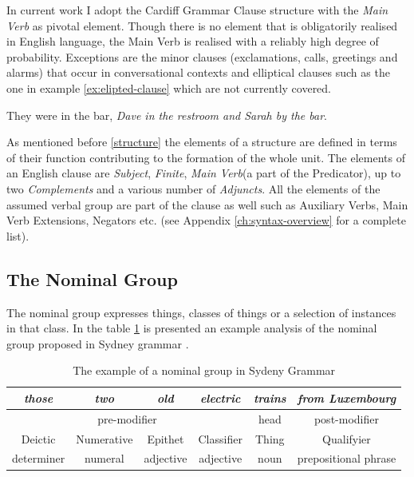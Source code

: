 In current work I adopt the Cardiff Grammar Clause structure with the \textit{Main Verb} as pivotal element. Though there is no element that is obligatorily realised in English language, the Main Verb is realised with a reliably high degree of probability. Exceptions are the minor clauses (exclamations, calls, greetings and alarms) that occur in conversational contexts and elliptical clauses \citet{Halliday2013} such as the one in example \ref{ex:elipted-clause} which are not currently covered.

\begin{exe}
	\ex\label{ex:elipted-clause} They were in the bar, \textit{Dave in the restroom and Sarah by the bar}.
\end{exe}

As mentioned before \ref{structure} the elements of a structure are defined in terms of their function contributing to the formation of the whole unit. The elements of an English clause are \textit{Subject}, \textit{Finite}, \textit{Main Verb}(a part of the Predicator), up to two \textit{Complements} and a various number of \textit{Adjuncts}. All the elements of the assumed verbal group are part of the clause as well such as Auxiliary Verbs, Main Verb Extensions, Negators etc. (see Appendix \ref{ch:syntax-overview} for a complete list). 



\subsection{The Nominal Group}
\label{sec:nominal-group}
The nominal group expresses things, classes of things or a selection of instances in that class. In the table \ref{tab:example-ng} is presented an example analysis of the nominal group proposed in Sydney grammar \citep[364--369]{Halliday2013}. 
\begin{table}[!ht]
	\begin{tabular}{|c|c|c|c|c|c|}
		\hline
		\textit{those} & \textit{two} & \textit{old} & \textit{electric} & \textit{trains} & \textit{from Luxembourg} \\ \hline
		\multicolumn{4}{|c|}{pre-modifier}                               & head            & post-modifier            \\ \hline
		Deictic        & Numerative   & Epithet      & Classifier        & Thing           & Qualifyier               \\ \hline
		determiner     & numeral      & adjective    & adjective         & noun            & prepositional phrase     \\ \hline
	\end{tabular}
	\caption{The example of a nominal group in Sydeny Grammar}
	\label{tab:example-ng}
\end{table}

